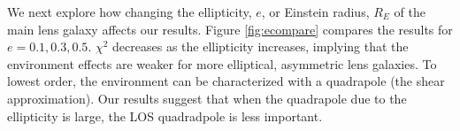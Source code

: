 We next explore how changing the ellipticity, $e$, or Einstein radius, $R_E$ of the main lens galaxy affects our results. Figure \ref{fig:ecompare} compares the results for $e=0.1, 0.3, 0.5$. $\chi^2$ decreases as the ellipticity increases, implying that the environment effects are weaker for more elliptical, asymmetric lens galaxies. To lowest order, the environment can be characterized with a quadrapole (the shear approximation). Our results suggest that when the quadrapole due to the  ellipticity  is large, the LOS quadradpole is less important.
  